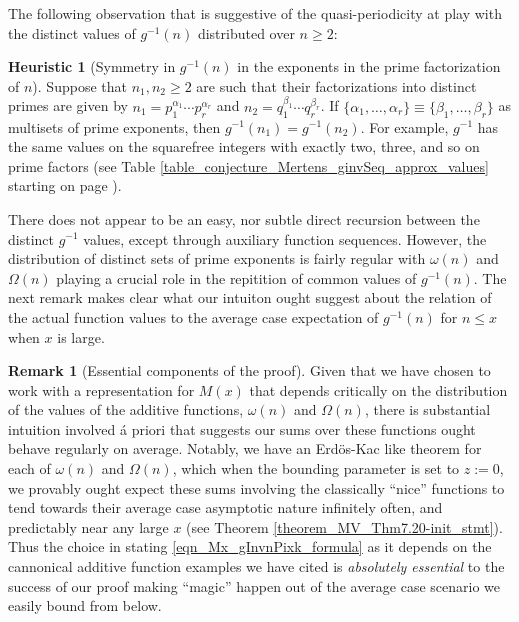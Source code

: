 \documentclass[11pt,reqno,a4letter]{article}
\numberwithin{figure}{section}
\numberwithin{table}{section}
\theoremstyle{plain}
\numberwithin{theorem}{section}
\theoremstyle{definition}
\newtheorem{remark}[theorem]{Remark}
\newtheorem{heuristic}[theorem]{Heuristic}
\begin{document}
The following observation that is suggestive of the quasi-periodicity at play 
with the distinct values of $g^{-1}(n)$ distributed over $n \geq 2$: 

\begin{heuristic}[Symmetry in $g^{-1}(n)$ in the exponents in the prime factorization of $n$] 
Suppose that $n_1, n_2 \geq 2$ are such that their factorizations into distinct primes are 
given by $n_1 = p_1^{\alpha_1} \cdots p_r^{\alpha_r}$ and $n_2 = q_1^{\beta_1} \cdots q_r^{\beta_r}$. 
If $\{\alpha_1, \ldots, \alpha_r\} \equiv \{\beta_1, \ldots, \beta_r\}$ as multisets of prime exponents, 
then $g^{-1}(n_1) = g^{-1}(n_2)$. For example, $g^{-1}$ has the same values on the squarefree integers 
with exactly two, three, and so on prime factors 
(see Table \ref{table_conjecture_Mertens_ginvSeq_approx_values} starting on page 
\pageref{table_conjecture_Mertens_ginvSeq_approx_values}). 
\end{heuristic} 

There does not appear to be an easy, nor subtle 
direct recursion between the distinct $g^{-1}$ values, except through auxiliary function sequences. 
However, the distribution of distinct sets of prime exponents is fairly regular with 
$\omega(n)$ and $\Omega(n)$ playing a crucial role in the repitition of common values of 
$g^{-1}(n)$. The next remark makes clear what our intuiton ought suggest about the relation of 
the actual function values to the average case expectation of $g^{-1}(n)$ for $n \leq x$ when 
$x$ is large. 

\begin{remark}[Essential components of the proof]
Given that we have chosen to work with a representation for $M(x)$ that depends critically on 
the distribution of the values of the additive functions, $\omega(n)$ and $\Omega(n)$, there is 
substantial intuition involved \'{a} priori that suggests our sums over these functions ought 
behave regularly on average. Notably, we have an Erd\"os-Kac like theorem for each of 
$\omega(n)$ and $\Omega(n)$, which when the bounding parameter is set to $z := 0$, we provably 
ought expect these sums involving the classically ``nice'' functions to tend towards their 
average case asymptotic nature infinitely often, and predictably near any large $x$ 
\cite[\S 1.7]{IWANIEC-KOWALSKI} (see Theorem \ref{theorem_MV_Thm7.20-init_stmt}). 
Thus the choice in stating \eqref{eqn_Mx_gInvnPixk_formula} as it depends on the 
cannonical additive function examples we have cited is 
\emph{absolutely essential} to the success of 
our proof making ``magic'' happen out of the average case 
scenario we easily bound from below. 
\end{remark} 
\end{document}

